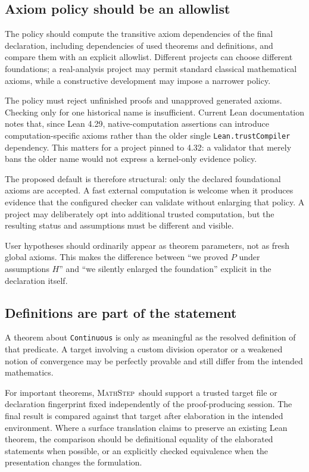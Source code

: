\documentclass[11pt,a4paper]{article}
\theoremstyle{remark}
\newcommand{\ms}{\textsc{MathStep}}
\newcommand{\ty}[1]{\texttt{#1}}
\begin{document}
\subsection{Axiom policy should be an allowlist}
The policy should compute the transitive axiom dependencies of the final declaration, including dependencies of used theorems and definitions, and compare them with an explicit allowlist. Different projects can choose different foundations; a real-analysis project may permit standard classical mathematical axioms, while a constructive development may impose a narrower policy.\cite{lean-axioms}

The policy must reject unfinished proofs and unapproved generated axioms. Checking only for one historical name is insufficient. Current Lean documentation notes that, since Lean 4.29, native-computation assertions can introduce computation-specific axioms rather than the older single \ty{Lean.trustCompiler} dependency.\cite{lean-validation} This matters for a project pinned to 4.32: a validator that merely bans the older name would not express a kernel-only evidence policy.

The proposed default is therefore structural: only the declared foundational axioms are accepted. A fast external computation is welcome when it produces evidence that the configured checker can validate without enlarging that policy. A project may deliberately opt into additional trusted computation, but the resulting status and assumptions must be different and visible.

User hypotheses should ordinarily appear as theorem parameters, not as fresh global axioms. This makes the difference between ``we proved $P$ under assumptions $H$'' and ``we silently enlarged the foundation'' explicit in the declaration itself.

\subsection{Definitions are part of the statement}
A theorem about \ty{Continuous} is only as meaningful as the resolved definition of that predicate. A target involving a custom division operator or a weakened notion of convergence may be perfectly provable and still differ from the intended mathematics.

For important theorems, \ms\ should support a trusted target file or declaration fingerprint fixed independently of the proof-producing session. The final result is compared against that target after elaboration in the intended environment. Where a surface translation claims to preserve an existing Lean theorem, the comparison should be definitional equality of the elaborated statements when possible, or an explicitly checked equivalence when the presentation changes the formulation.
\end{document}
